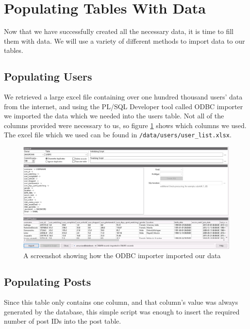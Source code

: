 \section{Populating Tables With Data}

Now that we have successfully created all the necessary data, it is time to fill them with data. We will use a variety of different methods to import data to our tables.

\subsection{Populating Users}

We retrieved a large excel file containing over one hundred thousand users' data from the internet, and using the PL/SQL Developer tool called ODBC importer we imported the data which we needed into the users table. Not all of the columns provided were necessary to us, so figure \ref{users-odbc} shows which columns we used. The excel file which we used can be found in \verb`/data/users/user_list.xlsx`.

\begin{figure}[hbtp]
	\centering
	\includegraphics[width=\linewidth]{images/users_odbc.jpeg}
	\caption{A screenshot showing how the ODBC importer imported our data}
	\label{users-odbc}
\end{figure}

\subsection{Populating Posts}

Since this table only contains one column, and that column's value was always generated by the database, this simple script was enough to insert the required number of post IDs into the post table.


